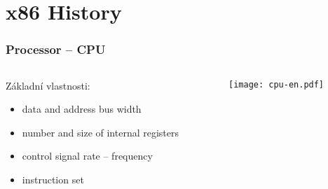 \documentclass{beamer}
\subtitle{Lekce 11. Architektura x86}
\subtitle{Lecture 11. x86 Architecture}
\author{Pavel Píša \phantom{xxxxxxxxx} Petr Štěpán \\ \small\texttt{pisa@fel.cvut.cz}\phantom{xxxx}\small\texttt{stepan@fel.cvut.cz}}
\begin{document}
\maketitle

\section{x86 History}

\begin{frame}
\frametitle{Processor -- CPU}
\begin{columns}[t,onlytextwidth]
\begin{column}{0.4\textwidth}
Základní vlastnosti:
  \begin{itemize}
    \item data and address bus width
    \item number and size of internal registers
    \item control signal rate – frequency
    \item instruction set
  \end{itemize}
\end{column}
\begin{column}{0.52\textwidth}  
   \begin{center}
   \texttt{[image: cpu-en.pdf]}
   \end{center}
\end{column}
\end{columns}
\end{frame}
\end{document}
